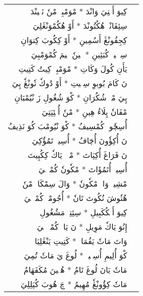 \documentclass[a4paper, 12pt]{report}
\begin{document}
\begin{longtable}{rl}
\textarabic{كِيوَ أَمٖتِيَ وَانْدَ  *  مْوَمْبِيٖ مْنٗ نَپٖينْدَ} & \\ 
\textarabic{سِئِفَانْيٖ هُكُتُونْدَ  *  أَوْ هُكُمْوَنْڠَلِيَ} & \\ 
[8mm] 

\textarabic{كِجِفُونْڠَ أَسُمِينِ  *  أَوْ كِكُوبَ كِتوَانِ} & \\ 
\textarabic{سِچٖلٖيوٖ كُبَئِينِ  *  نٖينٗ لٖيمَ كُمْوَمْبِيَ} & \\ 
[8mm] 

\textarabic{يَأَنِ كُولَ وَكَاتِ  *  مْوَمْبِيٖ كِيتُ كَتِيتِ} & \\ 
\textarabic{نَ كَامَ بُوبوِ سِكٖيتِ  *  أَوْ دُوكٗ تٗونْڠٗ پِيَ} & \\ 
[8mm] 

\textarabic{پِيَ مْپٖ شُكُرَانِ  *  كْوَ شُغُولِ زَ نْيُمْبَانِ} & \\ 
\textarabic{مْفَانٗ پِلَاءُ هِينِ  *  مْنٗ أُمٖئِپَتِيَ} & \\ 
[8mm] 

\textarabic{أُسِچٗوكٖ كُمْسِيفُ  *  كْوَ نْيُومْبَ كُوَ نَذِيفُ} & \\ 
\textarabic{نَ أُكِؤٗونَ أُچَافُ  *  أُسِيوٖ تَمُؤُكِيَ} & \\ 
[8mm] 

\textarabic{نَ فَرَاغَ أُكِپَاتَ  *  مْبٖئٖ يَاكٗ كِكُپِيتَ} & \\ 
\textarabic{أُسِيوٖ أُتَمُؤَاتَ  *  مْكٗونٗ كُمْپٖكٖيَ} & \\ 
[8mm] 

\textarabic{مْشِيكٖ وَاكٖ مْكٗونٗ  *  وَالَ سِمْكَازٖ مْنٗ} & \\ 
\textarabic{هُتٗوشَ نُكُوتَ تَانٗ  *  أُجُومْبٖ كُمْپٖكٖيَ} & \\ 
[8mm] 

\textarabic{كِيوَ أَمٖكُكَبِيلِ  *  سِئِتِيٖ مَشُغُولِ} & \\ 
\textarabic{إِنُوَ يَاكٗ مَوِيلِ  *  نَ يَاكٖ كُمْوٖلٖكٖيَ} & \\ 
[8mm] 

\textarabic{وَاتَ مَاتٗ يَفُمَانٖ  *  كَتِيتِ يَنْڠَلِيَانٖ} & \\ 
\textarabic{كْوَ أُلِيمِ أُسِنٖينٖ  *  لُوغَ يَ مَاتٗ تُمِيَ} & \\ 
[8mm] 

\textarabic{مَاتٗ يَانَ لُوغَ تَامُ  *  هُنٖينَ مُكَفَهَامُ} & \\ 
\textarabic{مَاتٗ كِؤُونْڠٗ مُهِيمُ  *  چَ هُوبَ كُپَلِلِيَ} & \\ 
[8mm] 


\end{longtable}
\end{document}
